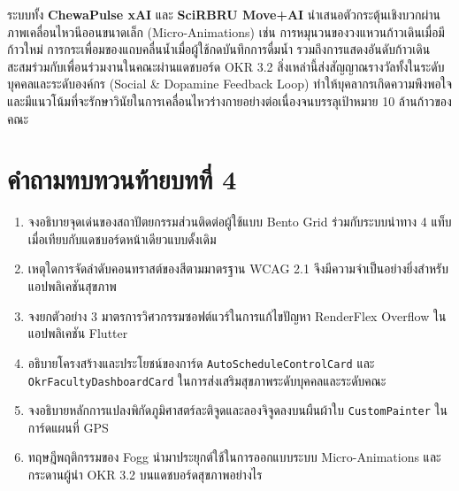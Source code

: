 ระบบทั้ง \textbf{ChewaPulse xAI} และ \textbf{SciRBRU Move+AI} นำเสนอตัวกระตุ้นเชิงบวกผ่านภาพเคลื่อนไหวนีออนขนาดเล็ก (Micro-Animations) เช่น การหมุนวนของวงแหวนก้าวเดินเมื่อมีก้าวใหม่ การกระเพื่อมของแถบคลื่นน้ำเมื่อผู้ใช้กดบันทึกการดื่มน้ำ รวมถึงการแสดงอันดับก้าวเดินสะสมร่วมกับเพื่อนร่วมงานในคณะผ่านแดชบอร์ด OKR 3.2 สิ่งเหล่านี้ส่งสัญญาณรางวัลทั้งในระดับบุคคลและระดับองค์กร (Social \& Dopamine Feedback Loop) ทำให้บุคลากรเกิดความพึงพอใจและมีแนวโน้มที่จะรักษาวินัยในการเคลื่อนไหวร่างกายอย่างต่อเนื่องจนบรรลุเป้าหมาย 10 ล้านก้าวของคณะ

\section*{คำถามทบทวนท้ายบทที่ 4}
\begin{enumerate}
    \item จงอธิบายจุดเด่นของสถาปัตยกรรมส่วนติดต่อผู้ใช้แบบ Bento Grid ร่วมกับระบบนำทาง 4 แท็บเมื่อเทียบกับแดชบอร์ดหน้าเดียวแบบดั้งเดิม
    \item เหตุใดการจัดลำดับคอนทราสต์ของสีตามมาตรฐาน WCAG 2.1 จึงมีความจำเป็นอย่างยิ่งสำหรับแอปพลิเคชันสุขภาพ
    \item จงยกตัวอย่าง 3 มาตรการวิศวกรรมซอฟต์แวร์ในการแก้ไขปัญหา RenderFlex Overflow ในแอปพลิเคชัน Flutter
    \item อธิบายโครงสร้างและประโยชน์ของการ์ด \texttt{AutoScheduleControlCard} และ \texttt{OkrFacultyDashboardCard} ในการส่งเสริมสุขภาพระดับบุคคลและระดับคณะ
    \item จงอธิบายหลักการแปลงพิกัดภูมิศาสตร์ละติจูดและลองจิจูดลงบนผืนผ้าใบ \texttt{CustomPainter} ในการ์ดแผนที่ GPS
    \item ทฤษฎีพฤติกรรมของ Fogg นำมาประยุกต์ใช้ในการออกแบบระบบ Micro-Animations และกระดานผู้นำ OKR 3.2 บนแดชบอร์ดสุขภาพอย่างไร
\end{enumerate}
\clearpage
